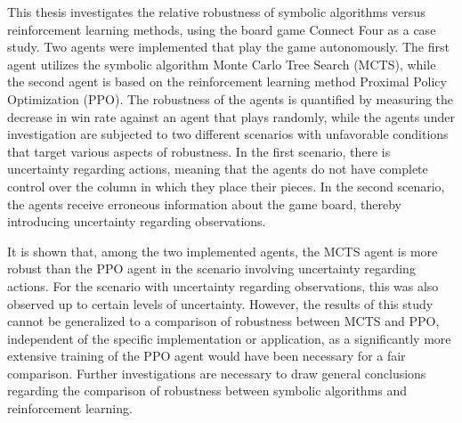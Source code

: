 This thesis investigates the relative robustness of symbolic algorithms versus reinforcement learning methods, using the board game Connect Four as a case study. Two agents were implemented that play the game autonomously. The first agent utilizes the symbolic algorithm Monte Carlo Tree Search (MCTS), while the second agent is based on the reinforcement learning method Proximal Policy Optimization (PPO). The robustness of the agents is quantified by measuring the decrease in win rate against an agent that plays randomly, while the agents under investigation are subjected to two different scenarios with unfavorable conditions that target various aspects of robustness. In the first scenario, there is uncertainty regarding actions, meaning that the agents do not have complete control over the column in which they place their pieces. In the second scenario, the agents receive erroneous information about the game board, thereby introducing uncertainty regarding observations.

It is shown that, among the two implemented agents, the MCTS agent is more robust than the PPO agent in the scenario involving uncertainty regarding actions. For the scenario with uncertainty regarding observations, this was also observed up to certain levels of uncertainty. However, the results of this study cannot be generalized to a comparison of robustness between MCTS and PPO, independent of the specific implementation or application, as a significantly more extensive training of the PPO agent would have been necessary for a fair comparison. Further investigations are necessary to draw general conclusions regarding the comparison of robustness between symbolic algorithms and reinforcement learning.

\newpage